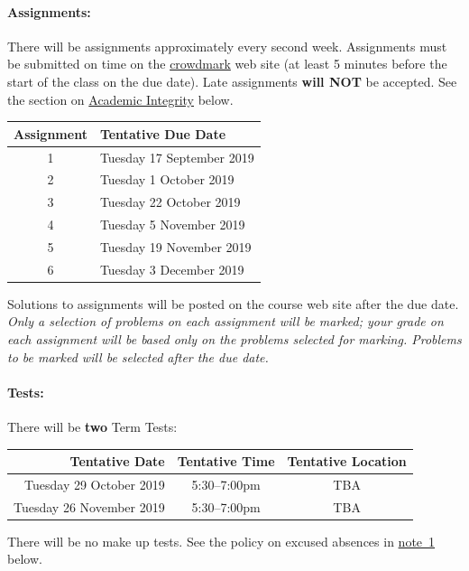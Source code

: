 \documentclass[12pt]{article}
\newcommand{\note}{\noindent{\bfseries\slshape Note:\/} }
\begin{document}
\paragraph*{Assignments:} There will be assignments approximately
every second week.  Assignments must be submitted on time on the
\href{https://crowdmark.com/}{crowdmark} web site (at least 5 minutes
before the start of the class on the due date).  Late assignments {\bf
  will NOT} be accepted.  See the section on
\hyperlink{dishonesty}{Academic Integrity} below.
%
\begin{center}
\begin{tabular}{c|l}
\bf Assignment & \bf Tentative Due Date \\\hline
1 & Tuesday 17 September 2019 \\
2 & Tuesday  1 October 2019 \\
3 & Tuesday 22 October 2019 \\
4 & Tuesday  5 November 2019 \\
5 & Tuesday 19 November 2019 \\
6 & Tuesday  3 December 2019
\end{tabular}
\end{center}
%
Solutions to assignments will be posted on the course web site after the due date.
\note \emph{Only a selection of problems on each assignment will be marked; your grade on each assignment will be based only on the problems selected for marking.  Problems to be marked will be selected after the due date.}



\paragraph*{Tests:}

There will be {\bf two} Term Tests:
\begin{center}
\begin{tabular}{r|c|c}
\bf Tentative Date & \bf Tentative Time & \bf Tentative Location \\\hline
Tuesday 29 October 2019 & 5:30--7:00pm & TBA \\
Tuesday 26 November 2019 & 5:30--7:00pm & TBA
\end{tabular}
\end{center}
\noindent
There will be no make up tests. See the policy on excused absences in \hyperlink{note1}{note~1} below.
\end{document}
